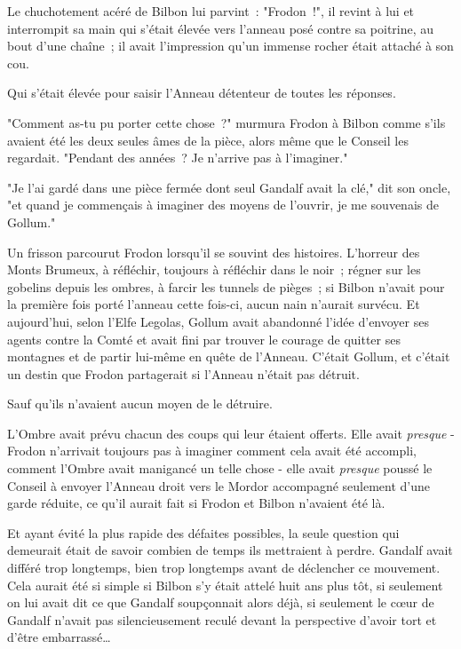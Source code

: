 Le chuchotement acéré de Bilbon lui parvint~: "Frodon~!", il revint à lui et interrompit sa main qui s'était élevée vers l'anneau posé contre sa poitrine, au bout d'une chaîne~; il avait l'impression qu'un immense rocher était attaché à son cou.

Qui s'était élevée pour saisir l'Anneau détenteur de toutes les réponses.

"Comment as-tu pu porter cette chose~?" murmura Frodon à Bilbon comme s'ils avaient été les deux seules âmes de la pièce, alors même que le Conseil les regardait. "Pendant des années~? Je n'arrive pas à l'imaginer."

"Je l'ai gardé dans une pièce fermée dont seul Gandalf avait la clé," dit son oncle, "et quand je commençais à imaginer des moyens de l'ouvrir, je me souvenais de Gollum."

Un frisson parcourut Frodon lorsqu'il se souvint des histoires. L'horreur des Monts Brumeux, à réfléchir, toujours à réfléchir dans le noir~; régner sur les gobelins depuis les ombres, à farcir les tunnels de pièges~; si Bilbon n'avait pour la première fois porté l'anneau cette fois-ci, aucun nain n'aurait survécu. Et aujourd'hui, selon l'Elfe Legolas, Gollum avait abandonné l'idée d'envoyer ses agents contre la Comté et avait fini par trouver le courage de quitter ses montagnes et de partir lui-même en quête de l'Anneau. C'était Gollum, et c'était un destin que Frodon partagerait si l'Anneau n'était pas détruit.

Sauf qu'ils n'avaient aucun moyen de le détruire.

L'Ombre avait prévu chacun des coups qui leur étaient offerts. Elle avait \emph{presque} - Frodon n'arrivait toujours pas à imaginer comment cela avait été accompli, comment l'Ombre avait manigancé un telle chose - elle avait \emph{presque} poussé le Conseil à envoyer l'Anneau droit vers le Mordor accompagné seulement d'une garde réduite, ce qu'il aurait fait si Frodon et Bilbon n'avaient été là.

Et ayant évité la plus rapide des défaites possibles, la seule question qui demeurait était de savoir combien de temps ils mettraient à perdre. Gandalf avait différé trop longtemps, bien trop longtemps avant de déclencher ce mouvement. Cela aurait été si simple si Bilbon s'y était attelé huit ans plus tôt, si seulement on lui avait dit ce que Gandalf soupçonnait alors déjà, si seulement le cœur de Gandalf n'avait pas silencieusement reculé devant la perspective d'avoir tort et d'être embarrassé…

